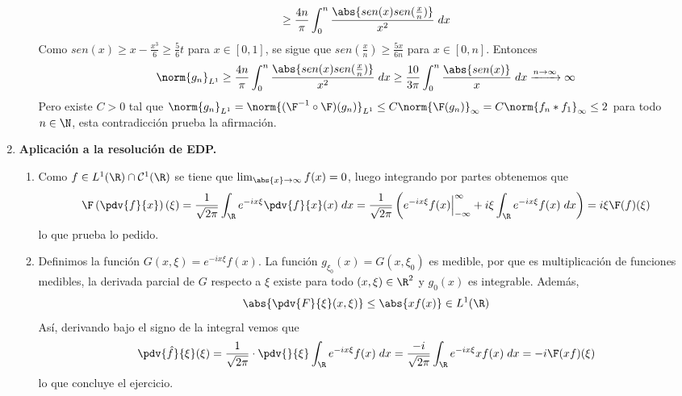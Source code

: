 \documentclass{article}
\begin{document}
\begin{enumerate}
\begin{enumerate}
\begin{align*}
            \geq\frac{4n}{\pi}\int_{0}^{n}
            \frac{\abs{sen(x)sen(\frac{x}{n})}}{x^{2}}\hspace{1mm}dx
        \end{align*}
        Como $sen(x)\geq x-\frac{x^{3}}{6}\geq\frac{5}{6}t$ para $x\in[0,1]$, se sigue que 
        $sen(\frac{x}{n})\geq\frac{5x}{6n}$ para $x\in[0,n]$. Entonces
        \begin{equation*}
            \norm{g_{n}}_{L^{1}}\geq\frac{4n}{\pi}\int_{0}^{n}
            \frac{\abs{sen(x)sen(\frac{x}{n})}}{x^{2}}\hspace{1mm}dx
            \geq\frac{10}{3\pi}\int_{0}^{n}
            \frac{\abs{sen(x)}}{x}\hspace{1mm}dx\xrightarrow[]{n\to\infty}\infty
        \end{equation*}
        Pero existe $C>0$ tal que $\norm{g_{n}}_{L^{1}}=\norm{(\F^{-1}\circ\F)(g_{n})}_{L^{1}}
        \leq C\norm{\F(g_{n})}_{\infty}=C\norm{f_{n}*f_{1}}_{\infty}\leq2$ para todo 
        $n\in\N$, esta contradicción prueba la afirmación.
    
    \end{enumerate}
    \item\textbf{Aplicación a la resolución de EDP.}
    \begin{enumerate}
        \item Como $f\in L^{1}(\R)\cap\mathcal{C}^{1}(\R)$ se tiene que 
        $\lim_{\abs{x}\to\infty}f(x)=0$, luego integrando por partes obtenemos que
        \begin{equation*}
            \F\left(\pdv{f}{x}\right)(\xi)
            =\frac{1}{\sqrt{2\pi}}\int_{\R}e^{-ix\xi}\pdv{f}{x}(x)\hspace{1mm}dx
            =\frac{1}{\sqrt{2\pi}}
            \left(e^{-ix\xi}f(x)\Big|_{-\infty}^{\infty}+i\xi\int_{\R}e^{-ix\xi}f(x)\hspace{1mm}dx
            \right)=i\xi\F(f)(\xi)
        \end{equation*}
        lo que prueba lo pedido.
        
        \item Definimos la función $G(x,\xi)=e^{-ix\xi}f(x)$. La función 
        $g_{\xi_{0}}(x)=G(x,\xi_{0})$ es medible, por que es multiplicación de funciones medibles,
        la derivada parcial de $G$ respecto a $\xi$ existe para todo $(x,\xi)\in\R^{2}$ y 
        $g_{0}(x)$ es integrable. Además,
        \begin{equation*}
            \abs{\pdv{F}{\xi}(x,\xi)}\leq\abs{xf(x)}\in L^{1}(\R)
        \end{equation*}
        Así, derivando bajo el signo de la integral vemos que
        \begin{equation*}
            \pdv{\hat{f}}{\xi}(\xi)
            =\frac{1}{\sqrt{2\pi}}\cdot\pdv{}{\xi}\int_{\R}e^{-ix\xi}f(x)\hspace{1mm}dx
            =\frac{-i}{\sqrt{2\pi}}\int_{\R}e^{-ix\xi}xf(x)\hspace{1mm}dx=-i\F(xf)(\xi)
        \end{equation*}
        lo que concluye el ejercicio.
    

\end{enumerate}
\end{enumerate}
\end{document}
